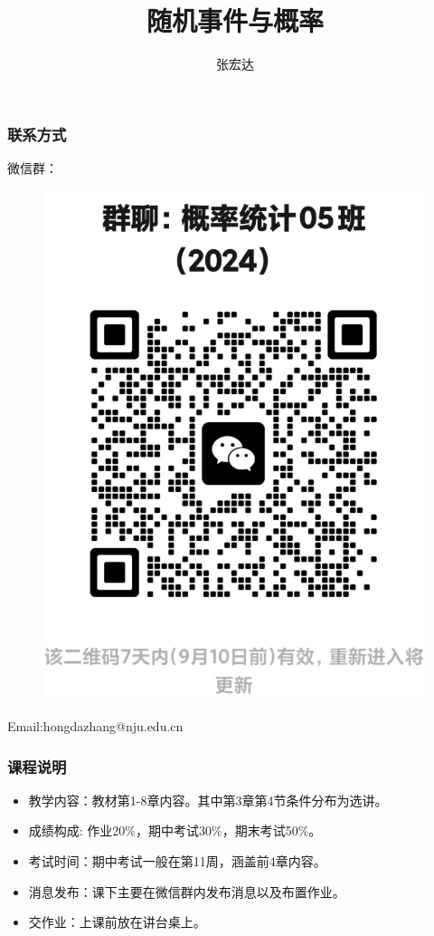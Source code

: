 \documentclass{beamer}
\title[]{随机事件与概率}
\author[概率统计]{张宏达}
\institute{Nanjing University}
\date{}
\begin{document}
	\begin{frame}
		\titlepage
	\end{frame}
	\begin{frame}
		\frametitle{联系方式}
		微信群：
		\begin{figure}[H]
			\centering
			\includegraphics[scale=0.13]{figures/概率统计05.png}
		\end{figure}
	Email:hongdazhang@nju.edu.cn
	\end{frame}
	
	\begin{frame}
		\frametitle{课程说明}
		\begin{itemize}
			\item 教学内容：教材第1-8章内容。其中第3章第4节条件分布为选讲。
			\item 成绩构成: 作业20\%，期中考试30\%，期末考试50\%。
			\item 考试时间：期中考试一般在第11周，涵盖前4章内容。
			\item 消息发布：课下主要在微信群内发布消息以及布置作业。
			\item 交作业：上课前放在讲台桌上。
		\end{itemize}
	\end{frame}
	
\end{document}
